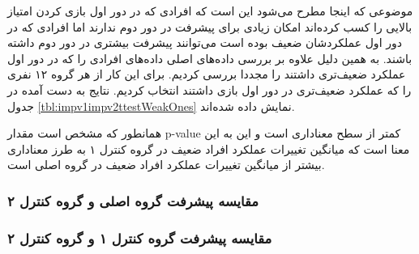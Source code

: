 \documentclass[twoside, a4paper,11pt]{book}
\numberwithin{equation}{chapter}
\numberwithin{table}{chapter}
\numberwithin{figure}{chapter}
\numberwithin{equation}{chapter}
\begin{document}
موضوعی که اینجا مطرح می‌شود این است که افرادی که در دور اول بازی کردن امتیاز بالایی را کسب کرده‌اند امکان زیادی برای پیشرفت در دور دوم ندارند اما افرادی که در دور اول عملکردشان ضعیف بوده است می‌توانند پیشرفت بیشتری در دور دوم داشته باشند. به همین دلیل علاوه بر بررسی داده‌های اصلی داده‌های افرادی را که در دور اول عملکرد ضعیف‌تری داشتند را مجددا بررسی کردیم. برای این کار از هر گروه ۱۲ نفری را که عملکرد ضعیف‌تری در دور اول بازی داشتند انتخاب کردیم. نتایج به دست آمده در جدول \ref{tbl:impv1impv2ttestWeakOnes} نمایش داده شده‌اند. 

\begin{table}[]
\end{table}

همانطور که مشخص است مقدار p-value کمتر از سطح معناداری است و این به این معنا است که میانگین تغییرات عملکرد افراد ضعیف در گروه کنترل ۱ به طرز معناداری بیشتر از میانگین تغییرات عملکرد افراد ضعیف در گروه اصلی است.

\subsubsection{مقایسه پیشرفت گروه اصلی و گروه کنترل ۲}
\subsubsection{مقایسه پیشرفت گروه کنترل ۱ و گروه کنترل ۲}
\end{document}
